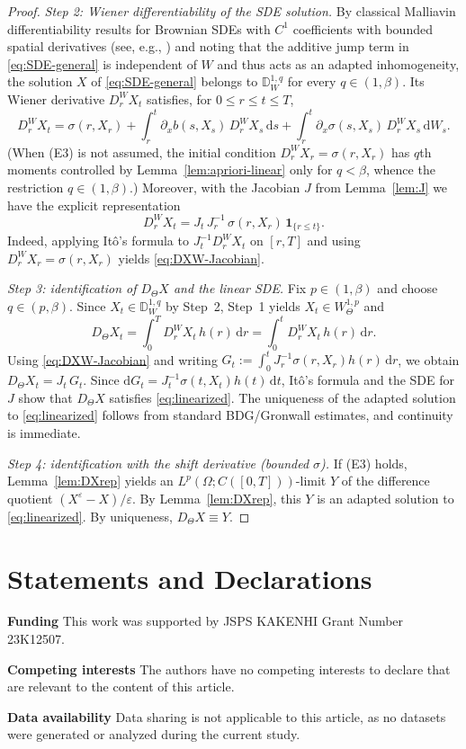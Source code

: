 \documentclass[11pt]{article}
\newcommand{\1}{\mathbf{1}}
\newcommand{\dd}{\mathrm{d}}
\theoremstyle{plain}
\theoremstyle{definition}
\theoremstyle{remark}
\begin{document}
\begin{proof}
\medskip
\noindent\emph{Step 2: Wiener differentiability of the SDE solution.}
By classical Malliavin differentiability results for Brownian SDEs with $C^1$ coefficients with bounded spatial derivatives (see, e.g., \cite{IshikawaKunita2006,Nualart2006}) and noting that the additive jump term in \eqref{eq:SDE-general} is independent of $W$ and thus acts as an adapted inhomogeneity, the solution $X$ of \eqref{eq:SDE-general} belongs to $\mathbb{D}_W^{1,q}$ for every $q\in(1,\beta)$.
Its Wiener derivative $D_r^W X_t$ satisfies, for $0\le r\le t\le T$,
\begin{equation}
D_r^W X_t=\sigma(r,X_r)+\int_r^t \partial_x b(s,X_s)\,D_r^W X_s\,\dd s+\int_r^t \partial_x\sigma(s,X_s)\,D_r^W X_s\,\dd W_s.
\end{equation}
(When (E3) is not assumed, the initial condition $D_r^W X_r=\sigma(r,X_r)$ has $q$th moments controlled by Lemma~\ref{lem:apriori-linear} only for $q<\beta$, whence the restriction $q\in(1,\beta)$.)
Moreover, with the Jacobian $J$ from Lemma~\ref{lem:J} we have the explicit representation
\begin{equation}\label{eq:DXW-Jacobian}
D_r^W X_t=J_t\,J_r^{-1}\,\sigma(r,X_r)\,\1_{\{r\le t\}}.
\end{equation}
Indeed, applying It\^o's formula to $J_t^{-1}D_r^W X_t$ on $[r,T]$ and using $D_r^W X_r=\sigma(r,X_r)$ yields \eqref{eq:DXW-Jacobian}.

\medskip
\noindent\emph{Step 3: identification of $D_\Theta X$ and the linear SDE.}
Fix $p\in(1,\beta)$ and choose $q\in(p,\beta)$.
Since $X_t\in \mathbb{D}_W^{1,q}$ by Step~2, Step~1 yields $X_t\in W^{1,p}_\Theta$ and
\[
D_\Theta X_t=\int_0^T D_r^W X_t\,h(r)\,\dd r=\int_0^t D_r^W X_t\,h(r)\,\dd r.
\]
Using \eqref{eq:DXW-Jacobian} and writing $G_t:=\int_0^t J_r^{-1}\sigma(r,X_r)h(r)\,\dd r$, we obtain $D_\Theta X_t=J_t\,G_t$.
Since $\dd G_t=J_t^{-1}\sigma(t,X_t)h(t)\,\dd t$, It\^o's formula and the SDE for $J$ show that $D_\Theta X$ satisfies \eqref{eq:linearized}.
The uniqueness of the adapted solution to \eqref{eq:linearized} follows from standard BDG/Gronwall estimates, and continuity is immediate.

\medskip
\noindent\emph{Step 4: identification with the shift derivative (bounded $\sigma$).}
If (E3) holds, Lemma~\ref{lem:DXrep} yields an $L^p(\Omega;C([0,T]))$-limit $Y$ of the difference quotient $(X^\varepsilon-X)/\varepsilon$.
By Lemma~\ref{lem:DXrep}, this $Y$ is an adapted solution to \eqref{eq:linearized}.
By uniqueness, $D_\Theta X\equiv Y$.
\end{proof}
\section*{Statements and Declarations}
\textbf{Funding} This work was supported by JSPS KAKENHI Grant Number 23K12507.

\noindent\textbf{Competing interests} The authors have no competing interests to declare that are relevant to the content of this article.

\noindent\textbf{Data availability} Data sharing is not applicable to this article, as no datasets were generated or analyzed during the current study.



\end{document}
